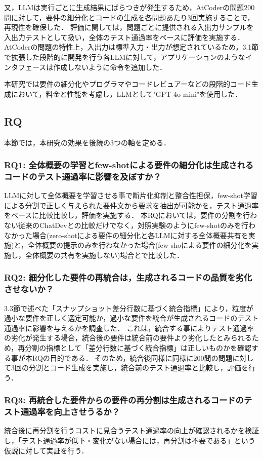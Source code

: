 \documentclass[submit,techrep,noauthor]{ipsj}
\begin{document}
又，LLMは実行ごとに生成結果にばらつきが発生するため，AtCoderの問題200問に対して，要件の細分化とコードの生成を各問題あたり3回実施することで，再現性を確保した．
評価に関しては，問題ごとに提供される入出力サンプルを入出力テストとして扱い，全体のテスト通過率をベースに評価を実施する．
AtCoderの問題の特性上，入出力は標準入力・出力が想定されているため，3.1節で拡張した段階的に開発を行う各LLMに対して，アプリケーションのようなインタフェースは作成しないように命令を追加した．

本研究では要件の細分化やプログラマやコードレビュアーなどの段階的コード生成において，料金と性能を考慮し，LLMとして"GPT-4o-mini"\cite{openai_gpt_4o_mini}を使用した．


\subsection{RQ}
本節では，本研究の効果を後続の3つの軸を定める．

\subsubsection{RQ1: 全体概要の学習とfew-shotによる要件の細分化は生成されるコードのテスト通過率に影響を及ぼすか？}
LLMに対して全体概要を学習させる事で断片化抑制と整合性担保，few-shot学習による分割で正しく与えられた要件文から要求を抽出が可能かを，テスト通過率をベースに比較比較し，評価を実施する．
本RQにおいては，要件の分割を行わない従来のChatDevとの比較だけでなく，対照実験のようにfew-shotのみを行わなかった場合(zero-shotによる要件の細分化と各LLMに対する全体概要共有を実施)と，全体概要の提示のみを行わなかった場合(few-shoによる要件の細分化を実施し，全体概要の共有を実施しない)場合とで比較した．

\subsubsection{RQ2: 細分化した要件の再統合は，生成されるコードの品質を劣化させないか？}
3.3節で述べた「スナップショット差分行数に基づく統合指標」により，粒度が過小な要件を正しく選定可能か，過小な要件を統合が生成されるコードのテスト通過率に影響を与えるかを調査した．
これは，統合する事によりテスト通過率の劣化が発生する場合，統合後の要件は統合前の要件より劣化したとみられるため，再分割の指標として「差分行数に基づく統合指標」は正しいものかを確認する事が本RQの目的である．
そのため，統合後同様に同様に200問の問題に対して3回の分割とコード生成を実施し，統合前のテスト通過率と比較し，評価を行う．


\subsubsection{RQ3: 再統合した要件からの要件の再分割は生成されるコードのテスト通過率を向上させうるか？}
統合後に再分割を行うコストに見合うテスト通過率の向上が確認されるかを検証し，「テスト通過率が低下・変化がない場合には，再分割は不要である」という仮説に対して実証を行う．
\end{document}
